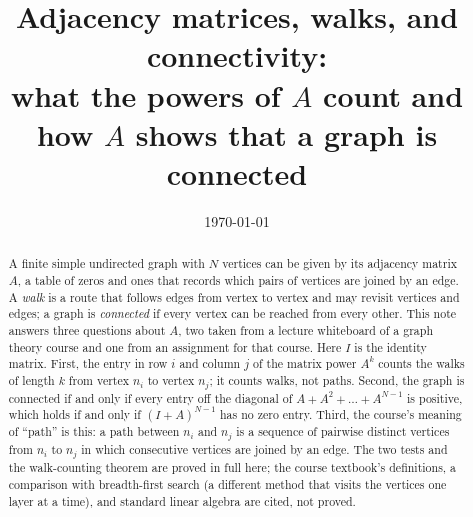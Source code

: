 \documentclass[11pt,a4paper]{article}
\title{Adjacency matrices, walks, and connectivity:\\
what the powers of $A$ count and how $A$ shows that a graph is connected}
\author{}
\date{\today}
\theoremstyle{definition}
\theoremstyle{plain}
\theoremstyle{remark}
\begin{document}
\maketitle

\begin{abstract}
A finite simple undirected graph with $N$ vertices can be given by its
adjacency matrix $A$, a table of zeros and ones that records which pairs of
vertices are joined by an edge. A \emph{walk} is a route that follows edges
from vertex to vertex and may revisit vertices and edges; a graph is
\emph{connected} if every vertex can be reached from every other. This note
answers three questions about $A$, two taken from a lecture whiteboard of a
graph theory course and one from an assignment for that course. Here $I$ is
the identity matrix. First, the entry in row $i$ and column $j$ of the
matrix power $A^k$ counts the walks of length $k$ from vertex $n_i$ to
vertex $n_j$; it counts walks, not paths. Second, the graph is connected if
and only if every entry off the diagonal of $A+A^2+\dots+A^{N-1}$ is
positive, which holds if and only if $(I+A)^{N-1}$ has no zero entry.
Third, the course's meaning of ``path'' is this: a path between $n_i$ and $n_j$ is a sequence of pairwise distinct
vertices from $n_i$ to $n_j$ in which consecutive vertices are joined by an
edge. The two tests and the walk-counting theorem are proved in full here;
the course textbook's definitions, a comparison with breadth-first search
(a different method that visits the vertices one layer at a time), and
standard linear algebra are cited, not proved.
\end{abstract}









\printbibliography

\appendix

\end{document}
